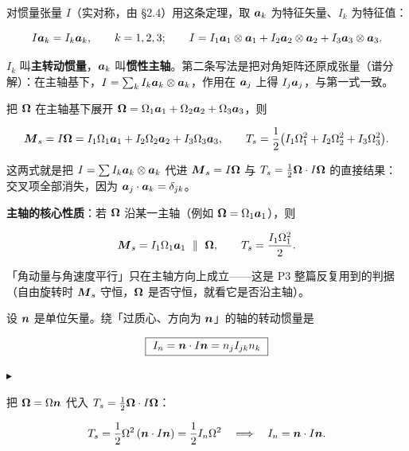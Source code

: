 \documentclass[11pt]{ctexart}
\newcommand{\step}[1]{\par\vspace{3pt}\noindent
  {\color{violet}\small$\blacktriangleright$}\hspace{3pt}{\bfseries\color{violetdeep}#1}\par\vspace{1pt}}
\begin{document}

对惯量张量 $I$（实对称，由 \S2.4）用这条定理，取 $\boldsymbol{a}_k$ 为特征矢量、$I_k$ 为特征值：

\[
I\boldsymbol{a}_k=I_k\boldsymbol{a}_k,\qquad k=1,2,3;
\qquad
I=I_1\boldsymbol{a}_1\otimes\boldsymbol{a}_1+I_2\boldsymbol{a}_2\otimes\boldsymbol{a}_2+I_3\boldsymbol{a}_3\otimes\boldsymbol{a}_3 .
\]

$I_k$ 叫\textbf{主转动惯量}，$\boldsymbol{a}_k$ 叫\textbf{惯性主轴}。第二条写法是把对角矩阵还原成张量（谱分解）：在主轴基下，$I=\sum_k I_k\boldsymbol{a}_k\otimes\boldsymbol{a}_k$，作用在 $\boldsymbol{a}_j$ 上得 $I_j\boldsymbol{a}_j$，与第一式一致。


把 $\boldsymbol{\Omega}$ 在主轴基下展开 $\boldsymbol{\Omega}=\Omega_1\boldsymbol{a}_1+\Omega_2\boldsymbol{a}_2+\Omega_3\boldsymbol{a}_3$，则

\[
\boldsymbol{M}_s=I\boldsymbol{\Omega}=I_1\Omega_1\boldsymbol{a}_1+I_2\Omega_2\boldsymbol{a}_2+I_3\Omega_3\boldsymbol{a}_3,
\qquad
T_s=\frac12\bigl(I_1\Omega_1^2+I_2\Omega_2^2+I_3\Omega_3^2\bigr).
\]

这两式就是把 $I=\sum I_k\boldsymbol{a}_k\otimes\boldsymbol{a}_k$ 代进 $\boldsymbol{M}_s=I\boldsymbol{\Omega}$ 与 $T_s=\frac12\boldsymbol{\Omega}\cdot I\boldsymbol{\Omega}$ 的直接结果：交叉项全部消失，因为 $\boldsymbol{a}_j\cdot\boldsymbol{a}_k=\delta_{jk}$。

\textbf{主轴的核心性质}：若 $\boldsymbol{\Omega}$ 沿某一主轴（例如 $\boldsymbol{\Omega}=\Omega_1\boldsymbol{a}_1$），则

\[
\vect M_s=I_1\Omega_1\vect a_1\ \parallel\ \vect{\Omega},
\qquad
T_s=\frac{I_1\Omega_1^2}{2}.
\]

「角动量与角速度平行」只在主轴方向上成立——这是 P3 整篇反复用到的判据（自由旋转时 $\boldsymbol{M}_s$ 守恒，$\boldsymbol{\Omega}$ 是否守恒，就看它是否沿主轴）。


设 $\boldsymbol{n}$ 是单位矢量。绕「过质心、方向为 $\boldsymbol{n}$」的轴的转动惯量是

\[
\boxed{\ I_n=\boldsymbol{n}\cdot I\boldsymbol{n}=n_jI_{jk}n_k\ }
\]

\step{推导}
把 $\boldsymbol{\Omega}=\Omega\boldsymbol{n}$ 代入 $T_s=\frac12\boldsymbol{\Omega}\cdot I\boldsymbol{\Omega}$：

\[
T_s=\frac12\Omega^2\,(\boldsymbol{n}\cdot I\boldsymbol{n})=\frac12 I_n\Omega^2
\quad\Longrightarrow\quad
I_n=\boldsymbol{n}\cdot I\boldsymbol{n} .
\]
\end{document}
